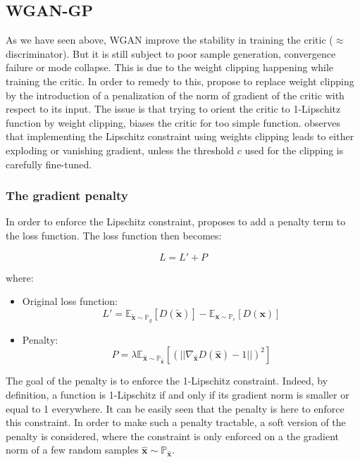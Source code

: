 \documentclass{article}
\begin{document}
\subsection{WGAN-GP}

As we have seen above, WGAN improve the stability in training the critic ($\approx$ discriminator). But it is still subject to poor sample generation, convergence failure or mode collapse. This is due to the weight clipping happening while training the critic. In order to remedy to this, \cite{DBLP:journals/corr/GulrajaniAADC17} propose to replace weight clipping by the introduction of a penalization of the norm of gradient of the critic with respect to its input. The issue is that trying to orient the critic to 1-Lipschitz function by weight clipping, biases the critic for too simple function. \cite{DBLP:journals/corr/GulrajaniAADC17} observes that implementing the Lipschitz constraint using weights clipping leads to either exploding or vanishing gradient, unless the threshold $c$ used for the clipping is carefully fine-tuned.

\subsubsection{The gradient penalty}

In order to enforce the Lipschitz constraint, \cite{DBLP:journals/corr/GulrajaniAADC17} proposes to add a penalty term to the loss function. The loss function then becomes: 

\begin{equation}
    L = L' + P
\end{equation}

where:

\begin{itemize}
    \item Original loss function: 
    \begin{equation}
        L' = \mathbb{E}_{\mathbf{\tilde{x}} \sim \mathbb{P}_g} [D(\mathbf{\tilde{x}})] - \mathbb{E}_{\mathbf{x} \sim \mathbb{P}_r} [D(\mathbf{x})]
    \end{equation}
    \item Penalty:
    \begin{equation}
        P = \lambda \mathbb{E}_{\hat{\mathbf{x}} \sim \mathbb{P}_{\hat{\mathbf{x}}}}[(||\nabla_{\hat{\mathbf{x}}} D(\hat{\mathbf{x}})-1||)^2]
    \end{equation}
\end{itemize}

The goal of the penalty is to enforce the 1-Lipschitz constraint. Indeed, by definition, a function is 1-Lipschitz if and only if its gradient norm is smaller or equal to 1 everywhere. It can be easily seen that the penalty is here to enforce this constraint. In order to make such a penalty tractable, a soft version of the penalty is considered, where the constraint is only enforced on a the gradient norm of a few random samples $\hat{\mathbf{x}} \sim \mathbb{P}_{\hat{\mathbf{x}}}$.
\end{document}
